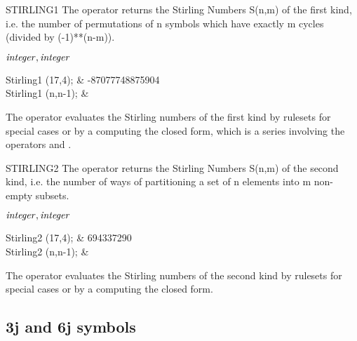 \begin{Operator}{STIRLING1}
The  operator returns the Stirling Numbers S(n,m) of the first
kind, i.e. the number of permutations of n symbols which have exactly m cycles
(divided by (-1)**(n-m)).

\begin{Syntax}
\(\meta{integer},\meta{integer}\)
\end{Syntax}

\begin{Examples}
Stirling1 (17,4);              &       -87077748875904 \\
Stirling1 (n,n-1);             &  
\end{Examples}

\begin{Comments}
The operator  evaluates the Stirling numbers of the
first kind by rulesets for special cases or by a computing the closed
form, which is a series involving the operators 
and .
\end{Comments}
\end{Operator}

\begin{Operator}{STIRLING2}
The  operator returns the Stirling Numbers S(n,m) of the 
second kind, i.e. the number of ways of partitioning a set of n elements
into m non-empty subsets.

\begin{Syntax}
\(\meta{integer},\meta{integer}\)
\end{Syntax}

\begin{Examples}
Stirling2 (17,4);              &       694337290 \\
Stirling2 (n,n-1);             &   
\end{Examples}

\begin{Comments}
The operator  evaluates the Stirling numbers of the
second kind by rulesets for special cases or by a computing the closed
form. 
\end{Comments}
\end{Operator}

\subsection{3j and  6j symbols}

